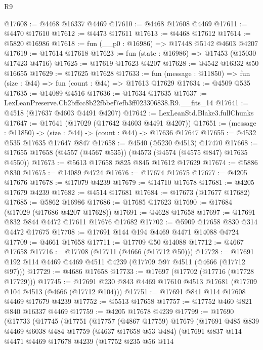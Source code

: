\begin{lexlean}{R9}
\begin{coremodule}
@17608 := @4468 @16337 @4469
@17610 := @4468 @17608 @4469
@17611 := @4470 @17610
@17612 := @4473 @17611
@17613 := @4468 @17612
@17614 := @5820 @16986
@17618 := fun (__p0 : @16986) => @17448 @5142 @4603 @4207
@17619 := @17614 @17618
@17623 := fun (state : @16986) => @17453 (@15030 @17423 @4716)
@17625 := @17619 @17623 @4207
@17628 := @4542 @16332 @50 @16655
@17629 := @17625 @17628
@17633 := fun (message : @11850) => fun (size : @44) => fun (count : @44) => @17613 @17629
@17634 := @4509 @535
@17635 := @14089 @4516
@17636 := @17634 @17635
@17637 := LexLeanPreserve.Cb2bffcc8b22fbbef7efb3ff023306838.R9.__fits_14
@17641 := @4518 (@17637 @4603 @4491 @4207)
@17642 := LexLeanStd.Blake3.fullChunks
@17647 := @17641 (@17029 (@17642 @4603 @4491 @4207))
@17651 := (message : @11850) -> (size : @44) -> (count : @44) -> @17636 @17647
@17655 := @4532 @535 @17635 @17647 @847
@17658 := @4540 (@5230 @4513) @17470
@17668 := @17655 @17658 (@4557 (@4567 @535)) (@4573 (@4574 (@4575 @847) @17635 @4550))
@17673 := @5613 @17658 @825 @845 @17612 @17629
@17674 := @5886 @830
@17675 := @14089 @4724
@17676 := @17674 @17675
@17677 := @4205 @17676
@17678 := @17079 @4239
@17679 := @14710 @17678
@17681 := @4205 @17679 @4239
@17682 := @4514 @17681
@17684 := @17673 (@17677 @17682)
@17685 := @5862 @16986
@17686 := @17685 @17623
@17690 := @17684 (@17029 (@17686 @4207 @17628))
@17691 := @4628 @17658
@17697 := @17691 @832 @844 @4472 @17611 @17676 @17682
@17702 := @5909 @17658 @830 @314 @4472 @17675
@17708 := @17691 @144 @194 @4469 @4471 @14088 @4724
@17709 := @4661 @17658
@17711 := @17709 @50 @14088
@17712 := @4667 @17658
@17716 := @17708 (@17711 (@4666 (@17712 @50)))
@17728 := @17691 @192 @114 @4469 @4469 @4511 @4239 (@17709 @97 @4511 (@4666 (@17712 @97)))
@17729 := @4686 @17658
@17733 := @17697 (@17702 (@17716 (@17728 @17729)))
@17745 := @17691 @230 @843 @4469 @17610 @4513 @17681 (@17709 @104 @4513 (@4666 (@17712 @104)))
@17751 := @17691 @841 @114 @17608 @4469 @17679 @4239
@17752 := @5513 @17658
@17757 := @17752 @460 @821 @840 @16337 @4469
@17759 := @4205 @17678 @4239
@17799 := @17690
    (@17733
      (@17745
        (@17751
          (@17757
            (@4867 @17759)
            @17679
            (@17691
              @485
              @839
              @4469
              @6038
              @484
              @17759
              (@4637 @17658 @53 @484)
              (@17691
                @837
                @114
                @4471
                @4469
                @17678
                @4239
                (@17752
                  @235
                  @56
                  @114

\end{coremodule}
\end{lexlean}
